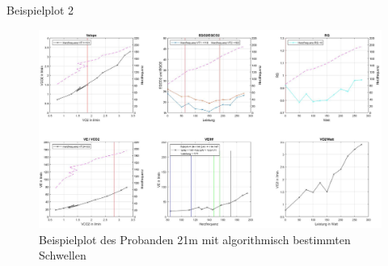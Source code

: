 \documentclass[colorBG,slideColor,8pt]{beamer}
\begin{document}
\begin{frame}{Beispielplot 2}
	\begin{figure}[H]
		\centering
			\includegraphics[width=0.85\linewidth]{Bilder/auto_21.png}
			\caption{Beispielplot des Probanden 21m mit algorithmisch bestimmten Schwellen}
	\end{figure}
\end{frame}
\end{document}

